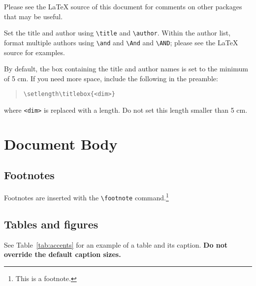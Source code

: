 \documentclass[11pt]{article}
\begin{document}
Please see the \LaTeX{} source of this document for comments on other packages that may be useful.

Set the title and author using \verb|\title| and \verb|\author|. Within the author list, format multiple authors using \verb|\and| and \verb|\And| and \verb|\AND|; please see the \LaTeX{} source for examples.

By default, the box containing the title and author names is set to the minimum of 5 cm. If you need more space, include the following in the preamble:
\begin{quote}
\begin{verbatim}
\setlength\titlebox{<dim>}
\end{verbatim}
\end{quote}
where \verb|<dim>| is replaced with a length. Do not set this length smaller than 5 cm.

\section{Document Body}

\subsection{Footnotes}

Footnotes are inserted with the \verb|\footnote| command.\footnote{This is a footnote.}

\subsection{Tables and figures}

See Table~\ref{tab:accents} for an example of a table and its caption.
\textbf{Do not override the default caption sizes.}
\end{document}
